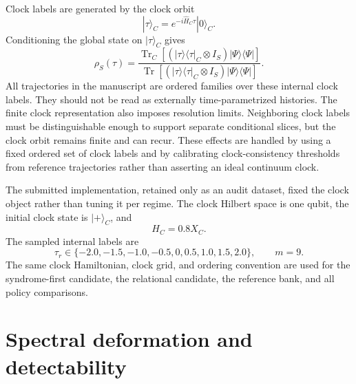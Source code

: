 \documentclass[11pt]{article}
\numberwithin{equation}{section}
\begin{document}
Clock labels are generated by the clock orbit
\begin{equation}
|\tau\rangle_C=e^{-i\hat H_C\tau}|0\rangle_C.
\end{equation}
Conditioning the global state on $|\tau\rangle_C$ gives
\begin{equation}
\rho_S(\tau)
=
\frac{
\operatorname{Tr}_C[
(|\tau\rangle\langle\tau|_C\otimes I_S)
|\Psi\rangle\langle\Psi|
]
}{
\operatorname{Tr}[
(|\tau\rangle\langle\tau|_C\otimes I_S)
|\Psi\rangle\langle\Psi|
]
}.
\end{equation}
All trajectories in the manuscript are ordered families over these internal clock
labels. They should not be read as externally time-parametrized histories.
The finite clock representation also imposes resolution limits. Neighboring clock
labels must be distinguishable enough to support separate conditional slices, but
the clock orbit remains finite and can recur. These effects are handled by using a
fixed ordered set of clock labels and by calibrating clock-consistency thresholds
from reference trajectories rather than asserting an ideal continuum clock.

The submitted implementation, retained only as an audit dataset, fixed the clock
object rather than tuning it per regime. The clock Hilbert space is one qubit,
the initial clock state is $|+\rangle_C$, and
\begin{equation}
H_C=0.8X_C .
\end{equation}
The sampled internal labels are
\begin{equation}
\tau_r\in\{-2.0,-1.5,-1.0,-0.5,0,0.5,1.0,1.5,2.0\},
\qquad m=9 .
\end{equation}
The same clock Hamiltonian, clock grid, and ordering convention are used for the
syndrome-first candidate, the relational candidate, the reference bank, and all
policy comparisons.

\section{Spectral deformation and detectability}
\end{document}
